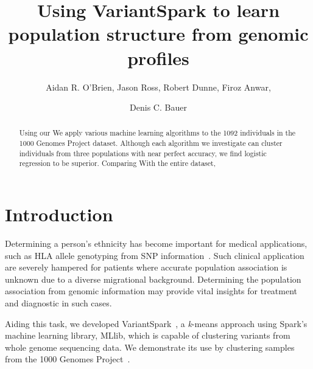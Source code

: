 \documentclass{llncs}
\newcommand{\variantSpark}{{\sc VariantSpark}}
\newcommand{\kMeans}{\textit{k}-means }
\begin{document}
\setcounter{save}{\value{section}}
{\def\addtocontents#1#2{}%
\def\addcontentsline#1#2#3{}%
\def\markboth#1#2{}%
%
\title{Using VariantSpark to learn population structure from genomic profiles}

\author{Aidan R. O'Brien, Jason Ross, Robert Dunne, Firoz Anwar, \and Denis C. Bauer}


\maketitle
%
\begin{abstract}
Using our 
We apply various machine learning algorithms to the 1092 individuals in the 1000 Genomes Project dataset.
Although each algorithm we investigate can cluster individuals from three populations with near perfect accuracy,
we find logistic regression to be superior. Comparing  With the entire dataset, 

\end{abstract}
%
\section{Introduction}
%


Determining a person's ethnicity has become important for medical applications, such as HLA allele genotyping from SNP
information~\cite{Zheng2014}. Such clinical application are severely hampered for patients where accurate population
association is unknown due to a diverse migrational background. Determining the population association from genomic
information may provide vital insights for treatment and diagnostic in such cases.

Aiding this task, we developed \variantSpark~\cite{OBrien}, a \kMeans{} approach using {\sc Spark}'s machine learning
library, {\sc MLlib}, which is capable of clustering variants from whole genome sequencing data.  We demonstrate its use
by clustering samples from the 1000 Genomes Project~\cite{1KG2012}. 

}
\end{document}
